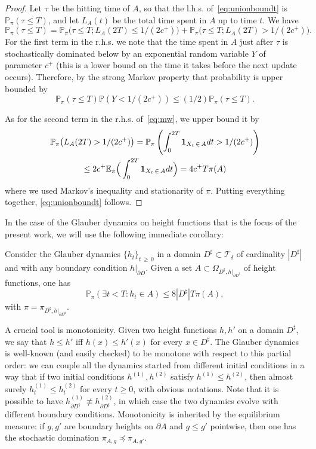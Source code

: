 \documentclass[10pt]{amsart}
\theoremstyle{definition}\newtheorem{defi}[theo]{Definition}\newtheorem{rema}[theo]{Remark}\newtheorem{exam}[theo]{Example}\newtheorem{exem}[theo]{Example}\newtheorem{nota}[theo]{Notation}
\newcommand{\E}{\mathbb{E}}
\renewcommand{\P}{\mathbb{P}}
\newcommand{\clT}{\mathcal{T}}
\renewcommand{\d}{{\sharp }}
\let\oldexists\exists
\renewcommand*{\exists}{\mathrel{\oldexists}}
\begin{document}
\begin{proof}
Let $\tau$ be the hitting time of $A$, so that the l.h.s. of~\eqref{eq:unionboundt} is $\P_\pi(\tau\le T)$, and let $L_A(t)$ be the total time spent in $A$ up to time $t$. We have
\begin{equation}\label{eq:mw}
\P_\pi(\tau\le T)=\P_\pi\big(\tau\le T;L_A(2T)\le 1/(2c^+)\big)+\P_\pi\big(\tau\le T;L_A(2T)> 1/(2c^+)\big).
\end{equation}
For the first term in the r.h.s. we note that the time spent in $A$ just after $\tau$ is stochastically dominated below by an exponential random variable $Y$ of parameter $c^+$ (this is a lower bound on the time it takes before the next update occurs). Therefore, by the strong Markov property that probability is upper bounded by
\begin{equation}
\P_\pi(\tau\le T)\P(Y<1/(2c^+))\le (1/2)\P_\pi(\tau\le T).
\end{equation}

As for the second term in the r.h.s. of~\eqref{eq:mw}, we upper bound it by
\begin{multline}
\P_\pi\big(L_A(2T)> 1/(2c^+)\big)= \P_\pi\left(\int_0^{2T}{\bf 1}_{X_t\,\in\,A}dt>1/(2c^+)
\right)\\
\le 2c^+\E_\pi\Big(\int_0^{2T}{\bf 1}_{X_t\,\in\,A}dt\Big)=4 c^+T\pi(A)
\end{multline}
where we used Markov's inequality and stationarity of $\pi$. Putting everything together, \eqref{eq:unionboundt} follows.
\end{proof}

In the case of the Glauber dynamics on height functions that is the focus of the present work, we will use the following immediate corollary:
\begin{coro}\label{cor:ubt}
Consider the Glauber dynamics $\{h_t\}_{t\,\ge\,0}$ in a domain $D^\d\subset \clT_\delta$ of cardinality $|D^\d|$ and with any boundary condition $h|_{\partial D}$. Given a set $A\subset \Omega_{D^\d,h|_{\partial D^\d}}$ of height functions, one has
\begin{equation}\label{eq:ubt}
\P_\pi\left(\exists t<T: h_t\in A\right)\le 8 |D^\d|T\pi(A),
\end{equation}
with $\pi=\pi_{D^\d,h|_{\partial D^\d}}$.
\end{coro}

A crucial tool is monotonicity. Given two height functions $h,h'$ on a domain $D^\d$, we say that $h\le h'$ iff $h(x)\le h'(x)$ for every $x\in D^\d$. The Glauber dynamics is well-known (and easily checked) to be monotone with respect to this partial order: we can couple all the dynamics started from different initial conditions in a way that if two initial conditions $h^{(1)},h^{(2)}$ satisfy $h^{(1)}\le h^{(2)}$, then almost surely $h^{(1)}_t\le h^{(2)}_t$ for every $t\ge0$, with obvious notations. Note that it is possible to have $h^{(1)}_{\partial D^\d}\not\equiv h^{(2)}_{\partial D^\d}$, in which case the two dynamics evolve with different boundary conditions. Monotonicity is inherited by the equilibrium measure: if $g,g'$ are boundary heights on $\partial A$ and $g\le g'$ pointwise, then one has the stochastic domination $\pi_{A,g}\preceq \pi_{A,g'}$.
\end{document}
